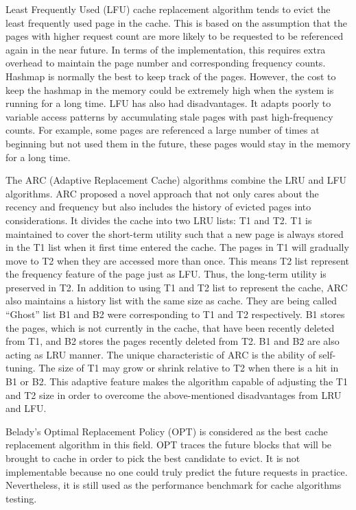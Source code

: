 \documentclass[letterpaper,twocolumn,10pt]{article}
\begin{document}
Least Frequently Used (LFU) cache replacement algorithm tends to evict the least frequently used page in the cache. This is based on the assumption that the pages with higher request count are more likely to be requested to be referenced again in the near future\cite{coffman1973operating}. In terms of the implementation, this requires extra overhead to maintain the page number and corresponding frequency counts. Hashmap is normally the best to keep track of the pages. However, the cost to keep the hashmap in the memory could be extremely high when the system is running for a long time. LFU has also had disadvantages. It adapts poorly to variable access patterns by accumulating stale pages with past high-frequency counts. For example, some pages are referenced a large number of times at beginning but not used them in the future, these pages would stay in the memory for a long time. 

The ARC (Adaptive Replacement Cache) algorithms combine the LRU and LFU algorithms\cite{megiddo2003arc}. ARC proposed a novel approach that not only cares about the recency and frequency but also includes the history of evicted pages into considerations\cite{consuegra2015analyzing}. It divides the cache into two LRU lists: T1 and T2. T1 is maintained to cover the short-term utility such that a new page is always stored in the T1 list when it first time entered the cache. The pages in T1 will gradually move to T2 when they are accessed more than once. This means T2 list represent the frequency feature of the page just as LFU. Thus, the long-term utility is preserved in T2. In addition to using T1 and T2 list to represent the cache, ARC also maintains a history list with the same size as cache. They are being called “Ghost” list B1 and B2 were corresponding to T1 and T2 respectively. B1 stores the pages, which is not currently in the cache, that have been recently deleted from T1, and B2 stores the pages recently deleted from T2. B1 and B2 are also acting as LRU manner. The unique characteristic of ARC is the ability of self-tuning. The size of T1 may grow or shrink relative to T2 when there is a hit in B1 or B2. This adaptive feature makes the algorithm capable of adjusting the T1 and T2 size in order to overcome the above-mentioned disadvantages from LRU and LFU.

Belady's Optimal Replacement Policy (OPT) is considered as the best cache replacement algorithm in this field\cite{belady1966study}\cite{mattson1970evaluation}. OPT traces the future blocks that will be brought to cache in order to pick the best candidate to evict. It is not implementable because no one could truly predict the future requests in practice. Nevertheless, it is still used as the performance benchmark for cache algorithms testing. 
\end{document}
